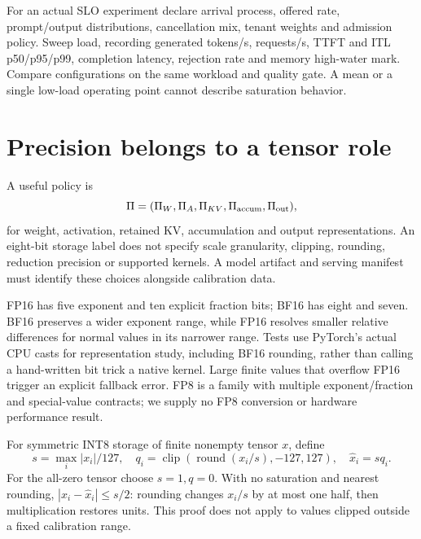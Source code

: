 For an actual SLO experiment declare arrival process, offered rate,
prompt/output distributions, cancellation mix, tenant weights and admission
policy. Sweep load, recording generated tokens/s, requests/s, TTFT and ITL
p50/p95/p99, completion latency, rejection rate and memory high-water mark.
Compare configurations on the same workload and quality gate. A mean or a
single low-load operating point cannot describe saturation behavior.

\section{Precision belongs to a tensor role}
\label{evod37:precision}
A useful policy is
\[
 \Pi=(\Pi_W,\Pi_A,\Pi_{KV},\Pi_{\rm accum},\Pi_{\rm out}),
\]
for weight, activation, retained KV, accumulation and output representations.
An eight-bit storage label does not specify scale granularity, clipping,
rounding, reduction precision or supported kernels. A model artifact and
serving manifest must identify these choices alongside calibration data.

FP16 has five exponent and ten explicit fraction bits; BF16 has eight and
seven. BF16 preserves a wider exponent range, while FP16 resolves smaller
relative differences for normal values in its narrower range. Tests use
PyTorch's actual CPU casts for representation study, including BF16
rounding, rather than calling a hand-written bit trick a native kernel.
Large finite values that overflow FP16 trigger an explicit fallback error.
FP8 is a family with multiple exponent/fraction and special-value contracts;
we supply no FP8 conversion or hardware performance result.

For symmetric INT8 storage of finite nonempty tensor $x$, define
\[
 s=\max_i|x_i|/127,\quad q_i=\operatorname{clip}
 (\operatorname{round}(x_i/s),-127,127),\quad\widehat x_i=sq_i.
\]
For the all-zero tensor choose $s=1,q=0$. With no saturation and nearest
rounding, $|x_i-\widehat x_i|\le s/2$: rounding changes $x_i/s$ by at most
one half, then multiplication restores units. This proof does not apply to
values clipped outside a fixed calibration range.


